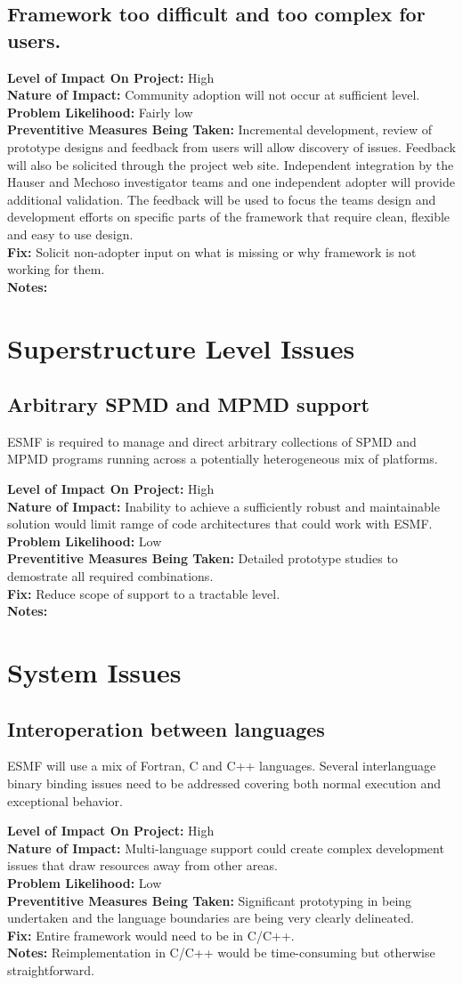 \documentclass[english]{article}
\newcommand{\req}[1]{\section{\hspace{.2in}#1}}
\newcommand{\sreq}[1]{\subsection{\hspace{.2in}#1}}
\newenvironment
{reqlist}
{\begin{list} {} {} \rm \item[]}
{\end{list}}
\begin{document}
\sreq{Framework too difficult and too complex for users.}
\begin{reqlist}
{\bf Level of Impact On Project:}  High \\
{\bf Nature of Impact:} Community adoption will not occur at sufficient level.\\
{\bf Problem Likelihood:} Fairly low \\
{\bf Preventitive Measures Being Taken:}
Incremental development, review of prototype designs and feedback from users
will allow discovery of issues. Feedback will also be solicited through the
project web site. Independent integration by the Hauser and Mechoso investigator
teams and one independent adopter will provide additional validation.
The feedback will be used to focus the teams design and development efforts on 
specific parts of the framework that require clean, flexible and easy to use design.
\\
{\bf Fix:} Solicit non-adopter input on what is missing or why framework is not working for them.\\
{\bf Notes:} \\
\end{reqlist}

\req{Superstructure Level Issues}
\sreq{Arbitrary SPMD and MPMD support}
ESMF is required to manage and direct arbitrary collections of SPMD and MPMD programs 
running across a potentially heterogeneous mix of platforms.
\begin{reqlist}
{\bf Level of Impact On Project:} High \\
{\bf Nature of Impact:} Inability to achieve a sufficiently robust and maintainable
solution would limit ramge of code architectures that could work with ESMF.\\
{\bf Problem Likelihood:} Low \\
{\bf Preventitive Measures Being Taken:} Detailed prototype studies to demostrate all required
combinations.\\
{\bf Fix:} Reduce scope of support to a tractable level.\\
{\bf Notes:}
\end{reqlist}

\req{System Issues}
\sreq{Interoperation between languages}
ESMF will use a mix of Fortran, C and C++ languages. Several interlanguage binary binding
issues need to be addressed covering both normal execution and exceptional
behavior.
\begin{reqlist}
{\bf Level of Impact On Project:} High \\
{\bf Nature of Impact:} Multi-language support could create complex development
issues that draw resources away from other areas.\\
{\bf Problem Likelihood:} Low\\
{\bf Preventitive Measures Being Taken:} Significant prototyping in being undertaken and
the language boundaries are being very clearly delineated.\\
{\bf Fix:} Entire framework would need to be in C/C++.\\
{\bf Notes:} Reimplementation in C/C++ would be time-consuming but
otherwise straightforward.
\end{reqlist}
\end{document}
